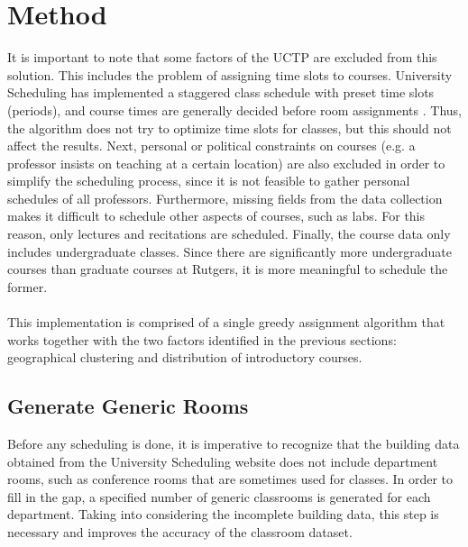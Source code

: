 \documentclass[12pt]{article}
\begin{document}
\section{Method}
It is important to note that some factors of the UCTP are excluded from this solution. This includes the problem of assigning time slots to courses. University Scheduling has implemented a staggered class schedule with preset time slots (periods), and course times are generally decided before room assignments \cite{citation2}. Thus, the algorithm does not try to optimize time slots for classes, but this should not affect the results. Next, personal or political constraints on courses (e.g. a professor insists on teaching at a certain location) are also excluded in order to simplify the scheduling process, since it is not feasible to gather personal schedules of all professors. Furthermore, missing fields from the data collection makes it difficult to schedule other aspects of courses, such as labs. For this reason, only lectures and recitations are scheduled. Finally, the course data only includes undergraduate classes. Since there are significantly more undergraduate courses than graduate courses at Rutgers, it is more meaningful to schedule the former. 
\\\\
This implementation is comprised of a single greedy assignment algorithm that works together with the two factors identified in the previous sections: geographical clustering and distribution of introductory courses.

\subsection{Generate Generic Rooms}
Before any scheduling is done, it is imperative to recognize that the building data obtained from the University Scheduling website does not include department rooms, such as conference rooms that are sometimes used for classes. In order to fill in the gap, a specified number of generic classrooms is generated for each department. Taking into considering the incomplete building data, this step is necessary and improves the accuracy of the classroom dataset.
\end{document}
